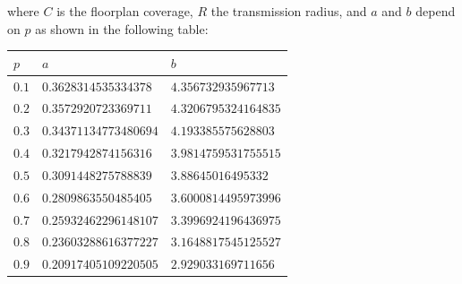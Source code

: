where $C$ is the floorplan coverage, $R$ the transmission radius, and $a$ and
$b$ depend on $p$ as shown in the following table:
\begin{center}
\begin{tabular}{ | m{1cm} | m{4cm}| m{4cm} | }
\hline
$p$&$a$&$b$\\
\hline
$0.1$&$0.3628314535334378$&$4.356732935967713$\\
\hline
$0.2$&$0.3572920723369711$&$4.3206795324164835$\\
\hline
$0.3$&$0.34371134773480694$&$4.193385575628803$\\
\hline
$0.4$&$0.3217942874156316$&$3.9814759531755515$\\
\hline
$0.5$&$0.3091448275788839$&$3.88645016495332$\\
\hline
$0.6$&$0.2809863550485405$&$3.6000814495973996$\\
\hline
$0.7$&$0.25932462296148107$&$3.3996924196436975$\\
\hline
$0.8$&$0.23603288616377227$&$3.1648817545125527$\\
\hline
$0.9$&$0.20917405109220505$&$2.929033169711656$\\
\hline
\end{tabular}
\end{center}
